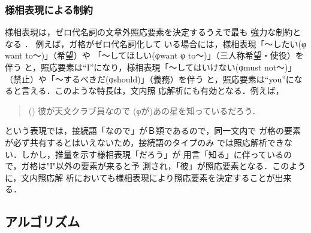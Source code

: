 \subsubsection{様相表現による制約}

様相表現は，ゼロ代名詞の文章外照応要素を決定するうえで最も
強力な制約となる
\cite{NakaiwaShiraiIkehara1994,NakaiwaShiraiIkeharaKawaoka1995}．
例えば，ガ格がゼロ代名詞化して
いる場合には，様相表現「〜したい(φ want to〜)」（希望）や
「〜してほしい(φwant φ to〜)」（三人称希望・使役）を伴う
と，照応要素は``I''になり，様相表現「〜してはいけない(φmust 
not〜)」（禁止）や「〜するべきだ(φshould)」（義務）を伴う
と，照応要素は``you''になると言える．このような特長は，文内照
応解析にも有効となる．例えば，
 
\begin{quote}
() 彼が天文クラブ員なので (φが)あの星を知っているだろう．
\end{quote}

\noindent
という表現では，接続語「なので」がＢ類であるので，同一文内で
ガ格の要素が必ず共有するとはいえないため，接続語のタイプのみ
では照応解析できない．しかし，推量を示す様相表現「だろう」が
用言「知る」に伴っているので，ガ格は"I"以外の要素が来ると予
測され，「彼」が照応要素となる．このように，文内照応解
析においても様相表現により照応要素を決定することが出来る．
\vspace*{-5mm}
\subsection{アルゴリズム}

